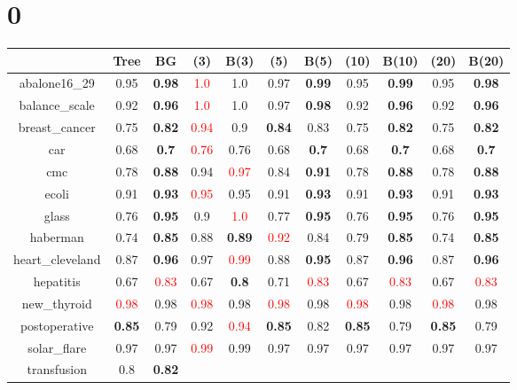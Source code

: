 \documentclass{article}%
\begin{document}
%
\normalsize%
\section*{0}%
\begin{tabular}{c|cccccccccc}%
\hline%
&Tree&BG&(3)&B(3)&(5)&B(5)&(10)&B(10)&(20)&B(20)\\%
\hline%
abalone16\_29&0.95&\textbf{0.98}&\textcolor{red}{ 
1.0
}&1.0&0.97&\textbf{0.99}&0.95&\textbf{0.99}&0.95&\textbf{0.98}\\%
\hline%
balance\_scale&0.92&\textbf{0.96}&\textcolor{red}{ 
1.0
}&1.0&0.97&\textbf{0.98}&0.92&\textbf{0.96}&0.92&\textbf{0.96}\\%
\hline%
breast\_cancer&0.75&\textbf{0.82}&\textcolor{red}{ 
0.94
}&0.9&\textbf{0.84}&0.83&0.75&\textbf{0.82}&0.75&\textbf{0.82}\\%
\hline%
car&0.68&\textbf{0.7}&\textcolor{red}{ 
0.76
}&0.76&0.68&\textbf{0.7}&0.68&\textbf{0.7}&0.68&\textbf{0.7}\\%
\hline%
cmc&0.78&\textbf{0.88}&0.94&\textcolor{red}{ 
0.97
}&0.84&\textbf{0.91}&0.78&\textbf{0.88}&0.78&\textbf{0.88}\\%
\hline%
ecoli&0.91&\textbf{0.93}&\textcolor{red}{ 
0.95
}&0.95&0.91&\textbf{0.93}&0.91&\textbf{0.93}&0.91&\textbf{0.93}\\%
\hline%
glass&0.76&\textbf{0.95}&0.9&\textcolor{red}{ 
1.0
}&0.77&\textbf{0.95}&0.76&\textbf{0.95}&0.76&\textbf{0.95}\\%
\hline%
haberman&0.74&\textbf{0.85}&0.88&\textbf{0.89}&\textcolor{red}{ 
0.92
}&0.84&0.79&\textbf{0.85}&0.74&\textbf{0.85}\\%
\hline%
heart\_cleveland&0.87&\textbf{0.96}&0.97&\textcolor{red}{ 
0.99
}&0.88&\textbf{0.95}&0.87&\textbf{0.96}&0.87&\textbf{0.96}\\%
\hline%
hepatitis&0.67&\textcolor{red}{ 
0.83
}&0.67&\textbf{0.8}&0.71&\textcolor{red}{ 
0.83
}&0.67&\textcolor{red}{ 
0.83
}&0.67&\textcolor{red}{ 
0.83
}\\%
\hline%
new\_thyroid&\textcolor{red}{ 
0.98
}&0.98&\textcolor{red}{ 
0.98
}&0.98&\textcolor{red}{ 
0.98
}&0.98&\textcolor{red}{ 
0.98
}&0.98&\textcolor{red}{ 
0.98
}&0.98\\%
\hline%
postoperative&\textbf{0.85}&0.79&0.92&\textcolor{red}{ 
0.94
}&\textbf{0.85}&0.82&\textbf{0.85}&0.79&\textbf{0.85}&0.79\\%
\hline%
solar\_flare&0.97&0.97&\textcolor{red}{ 
0.99
}&0.99&0.97&0.97&0.97&0.97&0.97&0.97\\%
\hline%
transfusion&0.8&\textbf{0.82}&\textcolor{red}{ 
}
\end{tabular}
\end{document}
